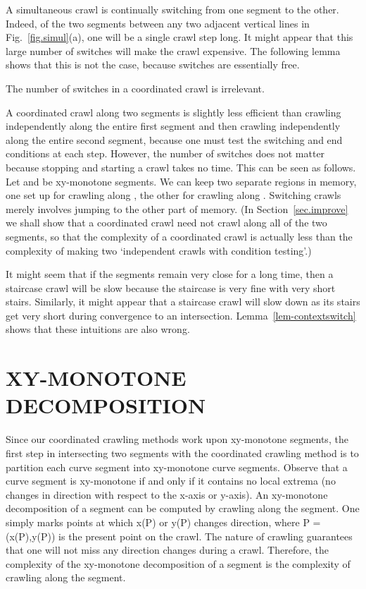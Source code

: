 A simultaneous crawl is continually switching from one segment to the other.
Indeed, of the two segments between any two adjacent vertical lines
in Fig.~\ref{fig.simul}(a), one will be a single crawl step long.
It might appear that this large number of switches will make the crawl expensive.
The following lemma shows that this is not the case, because switches are essentially free.

\begin{lemma}
\label{lem-contextswitch}
The number of switches in a coordinated crawl is irrelevant.
\end{lemma}
A coordinated crawl along two segments is slightly less efficient than
crawling independently along the entire first segment and then crawling 
independently along the entire second segment, because one must test
the switching and end conditions at each step.
However, the number of switches does not matter because 
stopping and starting a crawl takes no time.
This can be seen as follows.
Let  and  be xy-monotone segments.
We can keep two separate regions in memory, one set up for crawling
along , the other for crawling along .
Switching crawls merely involves jumping to the other part of memory. 
(In Section~\ref{sec.improve} we shall show that a coordinated crawl need not crawl along 
all of the two segments,
so that the complexity of a coordinated crawl is actually less than the complexity of making two 
`independent crawls with condition testing'.)
\QED

It might seem that if the segments remain very close for a long time, then a 
staircase crawl will be slow because the staircase is very fine with very short stairs. 
Similarly, it might appear that a staircase crawl will slow down as its stairs 
get very short during convergence to an intersection.
Lemma~\ref{lem-contextswitch} shows that these intuitions are also wrong.

\section{XY-MONOTONE DECOMPOSITION}
\label{sec-decomp}

Since our coordinated crawling methods work upon xy-monotone segments,
the first step in intersecting two segments with the coordinated crawling method is to
partition each curve segment into xy-monotone curve segments.
Observe that a curve segment is xy-monotone if and only if it contains 
no local extrema (no changes in direction with respect to the x-axis or y-axis).
An xy-monotone decomposition of a segment can be computed by crawling along the segment.
One simply marks points at which x(P) or y(P) changes direction,
where P = (x(P),y(P)) is the present point on the crawl.
The nature of crawling guarantees that one will not miss any direction changes during a crawl.
Therefore, the complexity of the xy-monotone decomposition of a segment is the
complexity of crawling along the segment.

